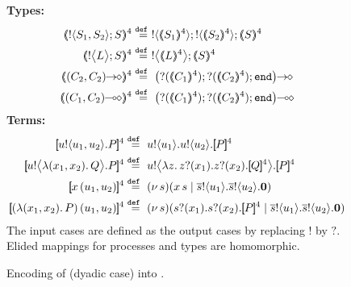 \begin{figure}[t]
{\bf Types:}
\begin{align*}
		\tmap{\btout{S_1, S_2}S}{4} &\defeq \btout{\tmap{S_1}{4}}  \btout{\tmap{S_2}{4}}\tmap{S}{4}
	\\
	 \tmap{\bbtout{L} S}{4} & \defeq  \bbtout{\mapt{L}^{4}}\mapt{S}^{4}
	\\
	  \tmap{\shot{(C_2,  C_2)}}{4} &\defeq \shot{\big(\btinp{\tmap{C_1}{4}} \btinp{\tmap{C_2}{4}}\tinact\big)}
	\\
	  \tmap{\lhot{(C_1,  C_2)}}{4} &\defeq \lhot{\big(\btinp{\tmap{C_1}{4}}  \btinp{\tmap{C_2}{4}}\tinact\big)}
\end{align*}
{\bf Terms:} 
\begin{align*}
	 \map{\bout{u}{u_1, u_2} P}^{4} &\defeq \bout{u}{u_1} \bout{u}{u_2} \map{P}^{4}
	\\
	 \map{\bbout{u}{\abs{(x_1, x_2)} Q} P}^{4} &\defeq \bbout{u}{\abs{z}\binp{z}{x_1} \binp{z}{x_2} \map{Q}^{4}} \map{P}^{4}
	\\
 \map{\appl{x}{(u_1, u_2)}}^{4} &\defeq \newsp{s}{\appl{x}{s} \Par \bout{\dual{s}}{u_1}   \bout{\dual{s}}{u_2} \inact}
	\\
	\map{\appl{(\abs{(x_1,x_2)}{P})}{(u_1, u_2)}}^{4} &\defeq
	\newsp{s}{\binp{s}{x_1}  \binp{s}{x_2} \pmap{P}{4} \Par \bout{\dual{s}}{u_1}  \bout{\dual{s}}{u_2} \inact} 
\end{align*}
The input cases are defined as the output cases by replacing $!$ by $?$. 
Elided mappings for  processes and types are 
homomorphic.
\caption{\label{f:enc:poltomon}Encoding of \PHOp (dyadic case) into \HOp. }
\end{figure}

